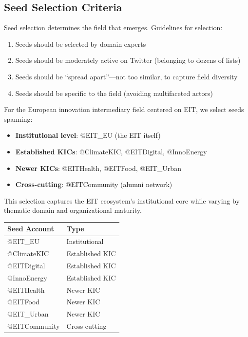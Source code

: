\documentclass[../main.tex]{subfiles}
\begin{document}
\subsection{Seed Selection Criteria}

Seed selection determines the field that emerges. Guidelines for selection:

\begin{enumerate}
    \item Seeds should be selected by domain experts
    \item Seeds should be moderately active on Twitter (belonging to dozens of lists)
    \item Seeds should be ``spread apart''---not too similar, to capture field diversity
    \item Seeds should be specific to the field (avoiding multifaceted actors)
\end{enumerate}

For the European innovation intermediary field centered on EIT, we select seeds spanning:

\begin{itemize}
    \item \textbf{Institutional level}: @EIT\_EU (the EIT itself)
    \item \textbf{Established KICs}: @ClimateKIC, @EITDigital, @InnoEnergy
    \item \textbf{Newer KICs}: @EITHealth, @EITFood, @EIT\_Urban
    \item \textbf{Cross-cutting}: @EITCommunity (alumni network)
\end{itemize}

This selection captures the EIT ecosystem's institutional core while varying by thematic domain and organizational maturity.

\begin{margintable}
\centering
\small
\begin{tabular}{ll}
\toprule
\textbf{Seed Account} & \textbf{Type} \\
\midrule
@EIT\_EU & Institutional \\
@ClimateKIC & Established KIC \\
@EITDigital & Established KIC \\
@InnoEnergy & Established KIC \\
@EITHealth & Newer KIC \\
@EITFood & Newer KIC \\
@EIT\_Urban & Newer KIC \\
@EITCommunity & Cross-cutting \\
\bottomrule
\end{tabular}
\caption{Seed accounts for field mapping}
\end{margintable}
\end{document}
